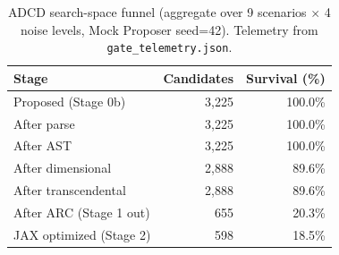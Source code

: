 \begin{table}[t]
\centering
\caption{ADCD search-space funnel (aggregate over 9 scenarios $\times$ 4 noise levels, Mock Proposer seed=42). Telemetry from \texttt{gate\_telemetry.json}.}
\label{tab:search_funnel}
\begin{tabular}{l r r}
\toprule
\textbf{Stage} & \textbf{Candidates} & \textbf{Survival (\%)} \\
\midrule
Proposed (Stage 0b) & 3,225 & 100.0\% \\
After parse & 3,225 & 100.0\% \\
After AST & 3,225 & 100.0\% \\
After dimensional & 2,888 & 89.6\% \\
After transcendental & 2,888 & 89.6\% \\
After ARC (Stage 1 out) & 655 & 20.3\% \\
JAX optimized (Stage 2) & 598 & 18.5\% \\
\bottomrule
\end{tabular}
\end{table}
